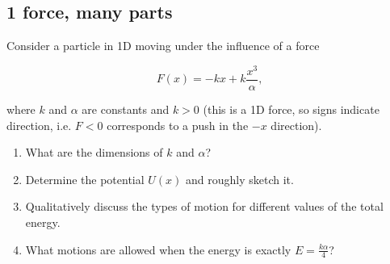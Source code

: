 \documentclass[12pt]{article}
\begin{document}
\subsection{1 force, many parts}
Consider a particle in 1D moving under the influence of a force

\[
F(x) = -kx + k \frac{x^3}{\alpha} ,
\]

where \(k\) and \(\alpha\) are constants and \(k > 0\) (this is a 1D force, so signs indicate direction, i.e. \(F < 0\) corresponds to a push in the \(-x\) direction).

\begin{enumerate}
    \item What are the dimensions of \(k\) and \(\alpha\)?
    \item Determine the potential \(U(x)\) and roughly sketch it.
    \item Qualitatively discuss the types of motion for different values of the total energy.
    \item What motions are allowed when the energy is exactly \(E = \frac{k \alpha}{4}\)?
\end{enumerate}
\end{document}
